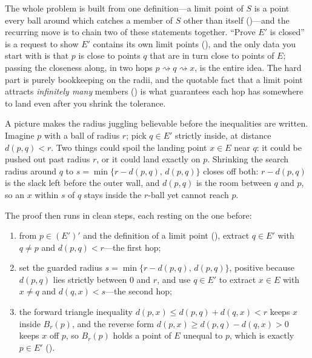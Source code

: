 \documentclass[main.tex]{subfiles}
\begin{document}
\begin{Reflection}
The whole problem is built from one definition---a limit point of $S$ is a point every ball around
which catches a member of $S$ other than itself ()---and the recurring move is to chain
two of these statements together. ``Prove $E'$ is closed'' is a request to show $E'$ contains its own
limit points (), and the only data you start with is that $p$ is close to points $q$ that
are in turn close to points of $E$; passing the closeness along, in two hops $p\rightsquigarrow
q\rightsquigarrow x$, is the entire idea. The hard part is purely bookkeeping on the radii, and the
quotable fact that a limit point attracts \emph{infinitely many} members
() is what guarantees each hop
has somewhere to land even after you shrink the tolerance.

A picture makes the radius juggling believable before the inequalities are written. Imagine $p$ with a
ball of radius $r$; pick $q\in E'$ strictly inside, at distance $d(p,q)<r$. Two things could spoil the
landing point $x\in E$ near $q$: it could be pushed out past radius $r$, or it could land exactly on
$p$. Shrinking the search radius around $q$ to $s=\min\{r-d(p,q),\,d(p,q)\}$ closes off both:
$r-d(p,q)$ is the slack left before the outer wall, and $d(p,q)$ is the room between $q$ and $p$, so an
$x$ within $s$ of $q$ stays inside the $r$-ball yet cannot reach $p$.

The proof then runs in clean steps, each resting on the one before:
\begin{enumerate}[leftmargin=1.7em,itemsep=3pt,topsep=2pt,label=\textnormal{(\arabic*)}]
  \item from $p\in(E')'$ and the definition of a limit point (), extract $q\in E'$ with
        $q\neq p$ and $d(p,q)<r$---the first hop;
  \item set the guarded radius $s=\min\{r-d(p,q),\,d(p,q)\}$, positive because $d(p,q)$ lies strictly
        between $0$ and $r$, and use $q\in E'$ to extract $x\in E$ with $x\neq q$ and $d(q,x)<s$---the
        second hop;
  \item the forward triangle inequality $d(p,x)\le d(p,q)+d(q,x)<r$ keeps $x$ inside $B_r(p)$, and the
        reverse form $d(p,x)\ge d(p,q)-d(q,x)>0$ keeps $x$ off $p$, so $B_r(p)$ holds a point of $E$
        unequal to $p$, which is exactly $p\in E'$ ().
\end{enumerate}


\end{Reflection}
\end{document}
